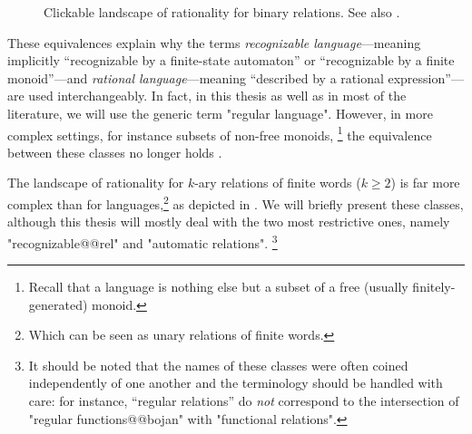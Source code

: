 \begin{figure}
	\caption{
		\AP\label{fig:landscape-rationality-relations}
		Clickable landscape of rationality for binary relations.
		See also .
	}
\end{figure}
These equivalences explain why the terms \emph{recognizable language}---meaning implicitly
``recognizable by a finite-state automaton'' or ``recognizable by a finite monoid''---and
\emph{rational language}---meaning ``described by a rational expression''---are used 
interchangeably. In fact, in this thesis as well as in most of the literature,
we will use the generic term "regular language".
However, in more complex settings, for instance subsets of non-free monoids,%
\footnote{Recall that a language is nothing else but a subset of a free
(usually finitely-generated) monoid.}
the equivalence between these classes no longer holds \cite{Pin2021StackExchange}.

The landscape of rationality for $k$-ary relations of finite words ($k \geq 2$) is far more complex than for languages,\footnote{Which can be seen as unary relations of finite words.} as depicted in . We will briefly present these classes,
although this thesis will mostly deal with the two most restrictive ones, namely
"recognizable@@rel" and "automatic relations".%
\footnote{It should be noted that the names
of these classes were often coined independently of one another
and the terminology should be handled with care: for instance,
``regular relations'' do \emph{not} correspond to the intersection of "regular functions@@bojan"
with "functional relations".}

